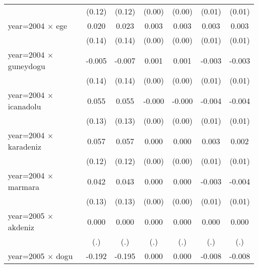 {\begin{tabular}{l*{6}{c}}
                    &      (0.12)         &      (0.12)         &      (0.00)         &      (0.00)         &      (0.01)         &      (0.01)         \\
year=2004 $\times$ ege&       0.020         &       0.023         &       0.003\sym{*}  &       0.003\sym{*}  &       0.003         &       0.003         \\
                    &      (0.14)         &      (0.14)         &      (0.00)         &      (0.00)         &      (0.01)         &      (0.01)         \\
year=2004 $\times$ guneydogu&      -0.005         &      -0.007         &       0.001         &       0.001         &      -0.003         &      -0.003         \\
                    &      (0.14)         &      (0.14)         &      (0.00)         &      (0.00)         &      (0.01)         &      (0.01)         \\
year=2004 $\times$ icanadolu&       0.055         &       0.055         &      -0.000         &      -0.000         &      -0.004         &      -0.004         \\
                    &      (0.13)         &      (0.13)         &      (0.00)         &      (0.00)         &      (0.01)         &      (0.01)         \\
year=2004 $\times$ karadeniz&       0.057         &       0.057         &       0.000         &       0.000         &       0.003         &       0.002         \\
                    &      (0.12)         &      (0.12)         &      (0.00)         &      (0.00)         &      (0.01)         &      (0.01)         \\
year=2004 $\times$ marmara&       0.042         &       0.043         &       0.000         &       0.000         &      -0.003         &      -0.004         \\
                    &      (0.13)         &      (0.13)         &      (0.00)         &      (0.00)         &      (0.01)         &      (0.01)         \\
year=2005 $\times$ akdeniz&       0.000         &       0.000         &       0.000         &       0.000         &       0.000         &       0.000         \\
                    &         (.)         &         (.)         &         (.)         &         (.)         &         (.)         &         (.)         \\
year=2005 $\times$ dogu&      -0.192         &      -0.195         &       0.000         &       0.000         &      -0.008         &      -0.008         \\

\end{tabular}}
